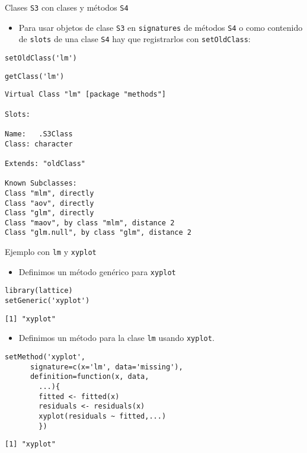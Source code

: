 \documentclass[xcolor={usenames,svgnames,dvipsnames}]{beamer}
\begin{document}
\begin{frame}[fragile,label=sec-3-3-1]{Clases \texttt{S3} con clases y métodos \texttt{S4}}
 \begin{itemize}
\item Para usar objetos de clase \texttt{S3} en \texttt{signatures} de métodos \texttt{S4} o
como contenido de \texttt{slots} de una clase \texttt{S4} hay que registrarlos con
\texttt{setOldClass}:
\end{itemize}
\lstset{language=R,numbers=none}
\begin{lstlisting}
setOldClass('lm')
\end{lstlisting}

\lstset{language=R,numbers=none}
\begin{lstlisting}
getClass('lm')
\end{lstlisting}

\begin{verbatim}
Virtual Class "lm" [package "methods"]

Slots:
                
Name:   .S3Class
Class: character

Extends: "oldClass"

Known Subclasses: 
Class "mlm", directly
Class "aov", directly
Class "glm", directly
Class "maov", by class "mlm", distance 2
Class "glm.null", by class "glm", distance 2
\end{verbatim}
\end{frame}
\begin{frame}[fragile,label=sec-3-3-2]{Ejemplo con \texttt{lm} y \texttt{xyplot}}
 \begin{itemize}
\item Definimos un método genérico para \texttt{xyplot}
\end{itemize}
\lstset{language=R,numbers=none}
\begin{lstlisting}
library(lattice)
setGeneric('xyplot')
\end{lstlisting}

\begin{verbatim}
[1] "xyplot"
\end{verbatim}

\begin{itemize}
\item Definimos un método para la clase \texttt{lm} usando \texttt{xyplot}.
\end{itemize}
\lstset{language=R,numbers=none}
\begin{lstlisting}
setMethod('xyplot',
	  signature=c(x='lm', data='missing'),
	  definition=function(x, data,
	    ...){
	    fitted <- fitted(x)
	    residuals <- residuals(x)
	    xyplot(residuals ~ fitted,...)
	    })
\end{lstlisting}

\begin{verbatim}
[1] "xyplot"
\end{verbatim}
\end{frame}
\end{document}
